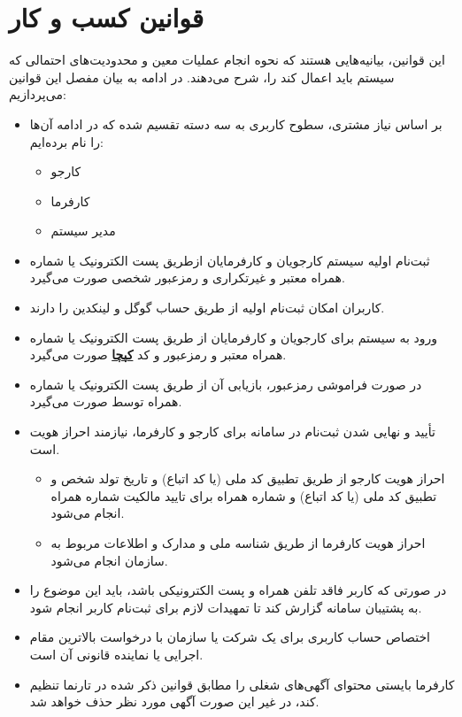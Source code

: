 \documentclass[12pt]{article}
\begin{document}
	\newpage

	\section{قوانین کسب و کار}
	این قوانین، بیانیه‌هایی هستند که نحوه انجام عملیات معین و محدودیت‌های احتمالی که سیستم باید اعمال کند را، شرح می‌دهند. در ادامه به بیان مفصل این قوانین می‌پردازیم:
	\begin{itemize}
		\item
		بر اساس نیاز مشتری، سطوح کاربری به سه دسته تقسیم شده که در ادامه آن‌ها را نام برده‌ایم:
		\begin{itemize}
			\item
			کارجو
			\item
			کارفرما
			\item
			مدیر سیستم
		\end{itemize}
		\item
		ثبت‌نام اولیه سیستم کارجویان و کارفرمایان از‌طریق پست الکترونیک یا شماره همراه معتبر و غیر‌تکراری و رمز‌عبور شخصی صورت می‌گیرد.
		\item
		کاربران امکان ثبت‌نام اولیه از طریق حساب گوگل و لینکدین را دارند.
		\item
		ورود به سیستم برای کارجویان و کارفرمایان از طر‌یق پست الکترونیک یا شماره همراه معتبر و رمز‌عبور و کد \textbf{\hyperref[ref:captcha]{کپچا}} صورت می‌گیرد.
		\item
		در‌ صورت فراموشی رمز‌عبور، بازیابی آن از طریق پست الکترونیک یا شماره همراه توسط صورت می‌گیرد.
		\item
		تأیید و نهایی شدن ثبت‌نام در سامانه برای کارجو و کارفرما، نیازمند احراز هویت است.
		\begin{itemize}
			\item
			احراز هویت کارجو از طریق تطبیق کد ملی (یا کد اتباع) و تاریخ تولد شخص و تطبیق کد ملی (یا کد اتباع) و شماره همراه برای تایید مالکیت شماره همراه انجام می‌شود.
			\item
			احراز هویت کارفرما از طریق شناسه ملی و مدارک و اطلاعات مربوط به سازمان انجام می‌شود.
		\end{itemize}
		\item
		در ‌صورتی که کاربر فاقد تلفن همراه و پست الکترونیکی باشد، باید این موضوع را به پشتیبان سامانه گزارش کند تا تمهیدات لازم برای ثبت‌نام کاربر انجام شود.
		\item
		اختصاص حساب کاربری برای یک شرکت یا سازمان با درخواست بالاترین مقام اجرایی یا نماینده قانونی آن است.
		\item
		کارفرما بایستی محتوای آگهی‌های شغلی را مطابق قوانین ذکر شده در تارنما تنظیم کند، در غیر‌ این صورت آگهی مورد نظر حذف خواهد شد.

\end{itemize}
\end{document}
